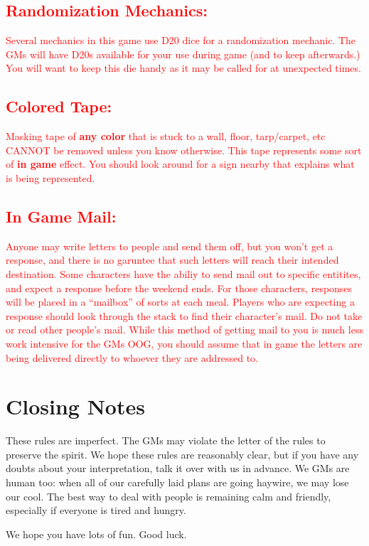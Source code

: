 \documentclass[sheet]{GL2020}
\begin{document}
\textcolor{red}{\subsection{Randomization Mechanics:}}
\textcolor{red}{Several mechanics in this game use D20 dice for a randomization mechanic. The GMs will have D20s available for your use during game (and to keep afterwards.) You will want to keep this die handy as it may be called for at unexpected times.}

\textcolor{red}{\subsection{Colored Tape:}}
\textcolor{red}{Masking tape of \textbf{any color} that is stuck to a wall, floor, tarp/carpet, etc CANNOT be removed unless you know otherwise. This tape represents some sort of \textbf{in game} effect. You should look around for a sign nearby that explains what is being represented.}

\textcolor{red}{\subsection{In Game Mail:}}
\textcolor{red}{Anyone may write letters to people and send them off, but you won't get a response, and there is no garuntee that such letters will reach their intended destination. Some characters have the abiliy to send mail out to specific entitites, and expect a response before the weekend ends. For those characters, responses will be placed in a ``mailbox'' of sorts at each meal. Players who are expecting a response should look through the stack to find their character's mail. Do not take or read other people's mail. While this method of getting mail to you is much less work intensive for the GMs OOG, you should assume that in game the letters are being delivered directly to whoever they are addressed to.}

\section{Closing Notes}

These rules are imperfect.  The GMs may violate the letter of the rules to preserve the spirit.  We hope these rules are reasonably clear, but if you have any doubts about your interpretation, talk it over with us in advance.  We GMs are human too: when all of our carefully laid plans are going haywire, we may lose our cool.  The best way to deal with people is remaining calm and friendly, especially if everyone is tired and hungry.

We hope you have lots of fun.  Good luck.
\end{document}
